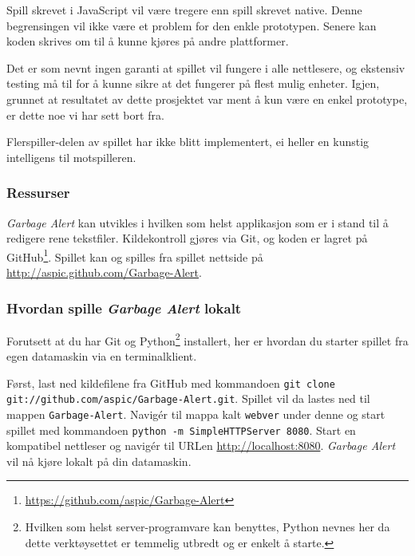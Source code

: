 Spill skrevet i JavaScript vil være tregere enn spill skrevet native.
Denne begrensingen vil ikke være et problem for den enkle prototypen.
Senere kan koden skrives om til å kunne kjøres på andre plattformer.

Det er som nevnt ingen garanti at spillet vil fungere i alle nettlesere,
og ekstensiv testing må til for å kunne sikre at det fungerer på flest
mulig enheter. Igjen, grunnet at resultatet av dette prosjektet var ment
å kun være en enkel prototype, er dette noe vi har sett bort fra.

Flerspiller-delen av spillet har ikke blitt implementert, ei heller en
kunstig intelligens til motspilleren.

\subsubsection{Ressurser}
\emph{Garbage Alert} kan utvikles i hvilken som helst applikasjon som er i
stand til å redigere rene tekstfiler. Kildekontroll gjøres via Git, og
koden er lagret på
GitHub\footnote{\url{https://github.com/aspic/Garbage-Alert}}. Spillet
kan og spilles fra spillet nettside på
\url{http://aspic.github.com/Garbage-Alert}.

\subsubsection{Hvordan spille \emph{Garbage Alert} lokalt}
Forutsett at du har Git og Python\footnote{Hvilken som helst
server-programvare kan benyttes, Python nevnes her da dette
verktøysettet er temmelig utbredt og er enkelt å starte.} installert,
her er hvordan du starter spillet fra egen datamaskin via en
terminalklient.

Først, last ned kildefilene fra GitHub med kommandoen
\newline\texttt{git clone git://github.com/aspic/Garbage-Alert.git}.
Spillet vil da lastes ned til mappen \texttt{Garbage-Alert}. Navigér til
mappa kalt \texttt{webver} under denne  og start spillet med kommandoen
\texttt{python -m SimpleHTTPServer 8080}. Start en kompatibel nettleser
og navigér til URLen \url{http://localhost:8080}. \emph{Garbage Alert} vil nå
kjøre lokalt på din datamaskin.
